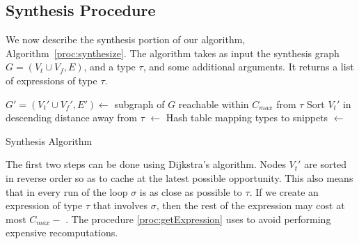 \subsection{Synthesis Procedure}
\label{sec:algorithm:synthesis}
We now describe the synthesis portion of our algorithm, Algorithm~\ref{proc:synthesize}. The algorithm takes as input the synthesis graph $G=(V_t \cup V_f, E)$, and a type $\tau$, and some additional arguments. It returns a list of expressions of type $\tau$.
\begin{algorithm}[hbt]
\BlankLine
$G'=(V_t'\cup V_f', E') \longleftarrow$ subgraph of $G$ reachable within $C_{max}$ from $\tau$ \;
Sort $V_t'$ in descending distance away from $\tau$ \;
\Snips $\longleftarrow$ Hash table mapping types to snippets \;
\Exprs $\longleftarrow$ \Snips[$\tau$] \;
\caption{Synthesis Algorithm}\label{proc:synthesize}
\end{algorithm}
The first two steps can be done using Dijkstra's algorithm. Nodes $V_t'$ are sorted in reverse order so as
to cache at the latest possible opportunity. This also means that in every run of the loop 
$\sigma$ is as close as possible to $\tau$. If we
create an expression of type  $\tau$ that involves $\sigma$, then the rest of the expression may cost at most $C_{max} - $
\Dist{$\sigma$}. The procedure \ref{proc:getExpression} uses \Snips to
avoid performing expensive recomputations.

